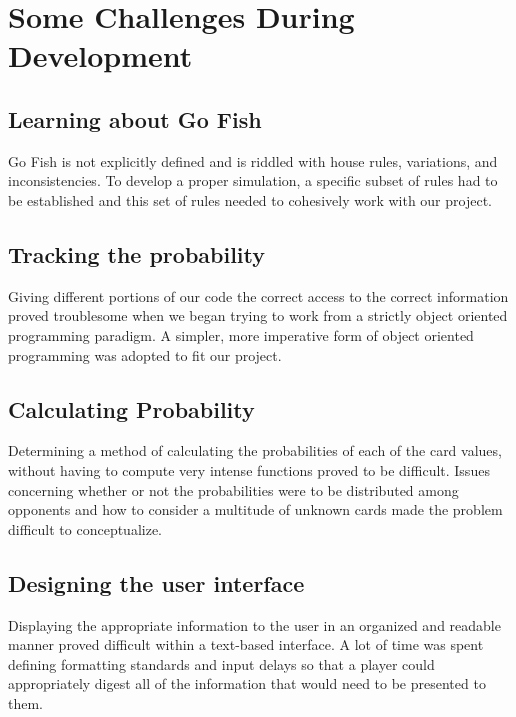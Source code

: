 \documentclass[preprint,12pt]{elsarticle}
\begin{document}
\section{Some Challenges During Development}
\label{S:3}

\subsection{Learning about Go Fish}
Go Fish is not explicitly defined and is riddled with house rules, variations, and inconsistencies. To develop a proper simulation, a specific subset of rules had to be established and this set of rules needed to cohesively work with our project.

\subsection{Tracking the probability}
Giving different portions of our code the correct access to the correct information proved troublesome when we began trying to work from a strictly object oriented programming paradigm. A simpler, more imperative form of object oriented programming was adopted to fit our project. 

\subsection{Calculating Probability}
Determining a method of calculating the probabilities of each of the card values, without having to compute very intense functions proved to be difficult. Issues concerning whether or not the probabilities were to be distributed among opponents and how to consider a multitude of unknown cards made the problem difficult to conceptualize. 

\subsection{Designing the user interface}
Displaying the appropriate information to the user in an organized and readable manner proved difficult within a text-based interface. A lot of time was spent defining formatting standards and input delays so that a player could appropriately digest all of the information that would need to be presented to them.



\end{document}
